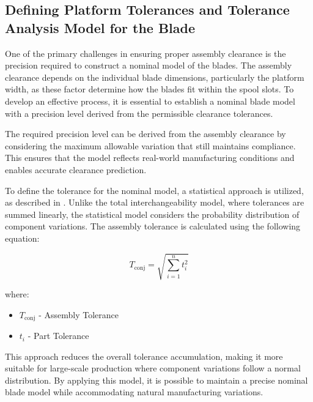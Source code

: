 \subsection{Defining Platform Tolerances and Tolerance Analysis Model for the Blade}
\label{subsec:desafios}

One of the primary challenges in ensuring proper assembly clearance is the precision required to construct a nominal model of the blades. The assembly clearance depends on the individual blade dimensions, particularly the platform width, as these factor determine how the blades fit within the spool slots. To develop an effective process, it is essential to establish a nominal blade model with a precision level derived from the permissible clearance tolerances.

The required precision level can be derived from the assembly clearance by considering the maximum allowable variation that still maintains compliance. This ensures that the model reflects real-world manufacturing conditions and enables accurate clearance prediction.

To define the tolerance for the nominal model, a statistical approach is utilized, as described in \cite{TSM}. Unlike the total interchangeability model, where tolerances are summed linearly, the statistical model considers the probability distribution of component variations. The assembly tolerance is calculated using the following equation:

\begin{equation}
    T_{\text{conj}} = \sqrt{\sum_{i=1}^{n} t_i^2}
    \label{eq:estat}
\end{equation}

where:
\begin{itemize}
\item $T_{\text{conj}}$ - Assembly Tolerance
\item $t_i$ - Part Tolerance
\end{itemize}

This approach reduces the overall tolerance accumulation, making it more suitable for large-scale production where component variations follow a normal distribution. By applying this model, it is possible to maintain a precise nominal blade model while accommodating natural manufacturing variations.

